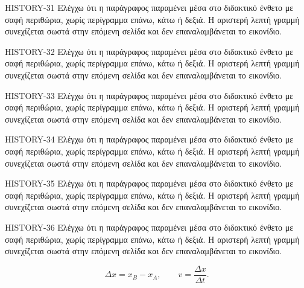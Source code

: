 \begin{HistoryBox}
HISTORY-31 Ελέγχω ότι η παράγραφος παραμένει μέσα στο διδακτικό ένθετο με σαφή περιθώρια, χωρίς περίγραμμα επάνω, κάτω ή δεξιά. Η αριστερή λεπτή γραμμή συνεχίζεται σωστά στην επόμενη σελίδα και δεν επαναλαμβάνεται το εικονίδιο.\par
HISTORY-32 Ελέγχω ότι η παράγραφος παραμένει μέσα στο διδακτικό ένθετο με σαφή περιθώρια, χωρίς περίγραμμα επάνω, κάτω ή δεξιά. Η αριστερή λεπτή γραμμή συνεχίζεται σωστά στην επόμενη σελίδα και δεν επαναλαμβάνεται το εικονίδιο.\par
HISTORY-33 Ελέγχω ότι η παράγραφος παραμένει μέσα στο διδακτικό ένθετο με σαφή περιθώρια, χωρίς περίγραμμα επάνω, κάτω ή δεξιά. Η αριστερή λεπτή γραμμή συνεχίζεται σωστά στην επόμενη σελίδα και δεν επαναλαμβάνεται το εικονίδιο.\par
HISTORY-34 Ελέγχω ότι η παράγραφος παραμένει μέσα στο διδακτικό ένθετο με σαφή περιθώρια, χωρίς περίγραμμα επάνω, κάτω ή δεξιά. Η αριστερή λεπτή γραμμή συνεχίζεται σωστά στην επόμενη σελίδα και δεν επαναλαμβάνεται το εικονίδιο.\par
HISTORY-35 Ελέγχω ότι η παράγραφος παραμένει μέσα στο διδακτικό ένθετο με σαφή περιθώρια, χωρίς περίγραμμα επάνω, κάτω ή δεξιά. Η αριστερή λεπτή γραμμή συνεχίζεται σωστά στην επόμενη σελίδα και δεν επαναλαμβάνεται το εικονίδιο.\par
HISTORY-36 Ελέγχω ότι η παράγραφος παραμένει μέσα στο διδακτικό ένθετο με σαφή περιθώρια, χωρίς περίγραμμα επάνω, κάτω ή δεξιά. Η αριστερή λεπτή γραμμή συνεχίζεται σωστά στην επόμενη σελίδα και δεν επαναλαμβάνεται το εικονίδιο.\par
\[\Delta x=x_B-x_A,\qquad v=\frac{\Delta x}{\Delta t}.\]
\end{HistoryBox}

